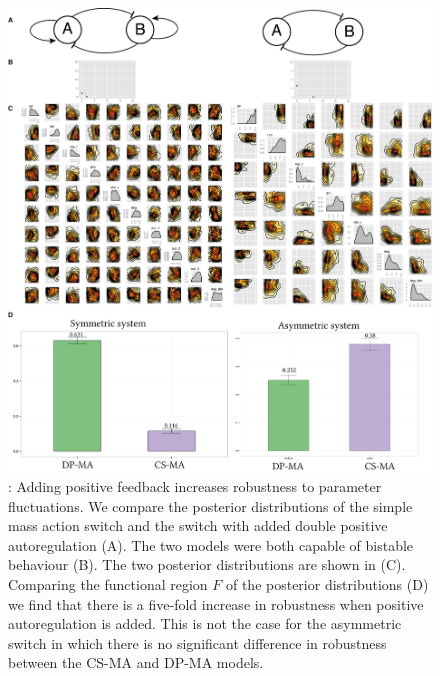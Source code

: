 {\begin{figure}[h]
\begin{center}
\includegraphics[scale=0.5]{chapterStabilityFinder/images/MA_sym_post.png}
\caption[LoF caption]{ \label{fig:fig4}: Adding positive feedback increases robustness to parameter fluctuations. We compare the posterior distributions of the simple mass action switch and the switch with added double positive autoregulation (A). The two models were both capable of bistable behaviour (B). The two posterior distributions are shown in (C). Comparing the functional region $F$ of the posterior distributions (D) we find that there is a five-fold increase in robustness when positive autoregulation is added. This is not the case for the asymmetric switch in which there is no significant difference in robustness between the CS-MA and DP-MA models.}
\end{center}
\end{figure}
\clearpage

}
